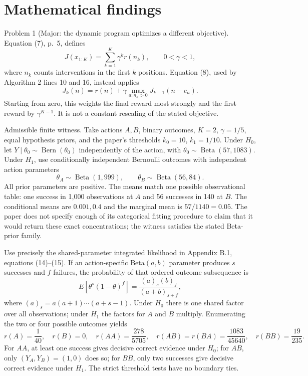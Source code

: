 \documentclass[10pt]{article}
\begin{document}
\section*{Mathematical findings}
Problem 1 (Major: the dynamic program optimizes a different objective).  Equation (7), p. 5, defines \[J(x_{1:K})=\sum_{k=1}^{K}\gamma^k r(n_k),\qquad 0<\gamma<1,\] where \(n_k\) counts interventions in the first \(k\) positions. Equation (8), used by Algorithm 2 lines 10 and 16, instead applies \[J_k(n)=r(n)+\gamma\max_{a:n_a>0}J_{k-1}(n-e_a).\] Starting from zero, this weights the final reward most strongly and the first reward by \(\gamma^{K-1}\). It is not a constant rescaling of the stated objective.\par
Admissible finite witness. Take actions \(A,B\), binary outcomes, \(K=2\), \(\gamma=1/5\), equal hypothesis priors, and the paper’s thresholds \(k_0=10\), \(k_1=1/10\). Under \(H_0\), let \(Y\mid\theta_0\sim\operatorname{Bern}(\theta_0)\) independently of the action, with \(\theta_0\sim\operatorname{Beta}(57,1083)\). Under \(H_1\), use conditionally independent Bernoulli outcomes with independent action parameters \[\theta_A\sim\operatorname{Beta}(1,999),\qquad
 \theta_B\sim\operatorname{Beta}(56,84).\] All prior parameters are positive. The means match one possible observational table: one success in 1,000 observations at \(A\) and 56 successes in 140 at \(B\). The conditional means are \(0.001,0.4\) and the marginal mean is \(57/1140=0.05\). The paper does not specify enough of its categorical fitting procedure to claim that it would return these exact concentrations; the witness satisfies the stated Beta-prior family.\par
Use precisely the shared-parameter integrated likelihood in Appendix B.1, equations (14)–(15). If an action-specific Beta\((a,b)\) parameter produces \(s\) successes and \(f\) failures, the probability of that ordered outcome subsequence is \[E[\theta^s(1-\theta)^f]
 =\frac{(a)_s(b)_f}{(a+b)_{s+f}},\] where \((a)_s=a(a+1)\cdots(a+s-1)\). Under \(H_0\) there is one shared factor over all observations; under \(H_1\) the factors for \(A\) and \(B\) multiply. Enumerating the two or four possible outcomes yields \[r(A)=\frac1{40},\quad r(B)=0,\quad
 r(AA)=\frac{278}{5705},\quad
 r(AB)=r(BA)=\frac{1083}{45640},\quad
 r(BB)=\frac{19}{235}.\] For \(AA\), at least one success gives decisive correct evidence under \(H_0\); for \(AB\), only \((Y_A,Y_B)=(1,0)\) does so; for \(BB\), only two successes give decisive correct evidence under \(H_1\). The strict threshold tests have no boundary ties.\par
\end{document}
